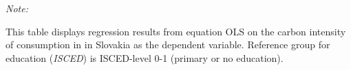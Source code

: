 \begin{table}[htbp!]
\begin{adjustbox}{width = 1\textwidth, max height = 0.95\textheight, center}
\begin{threeparttable}[b]
         \begin{tablenotes}\item \medskip \textit{Note:}
            \item This table displays regression results from equation OLS on the carbon intensity of consumption in  in Slovakia as the dependent variable. Reference group for education (\textit{ISCED}) is ISCED-level 0-1 (primary or no education).
         \end{tablenotes}
      \end{threeparttable}
   \end{adjustbox}
\end{table}


